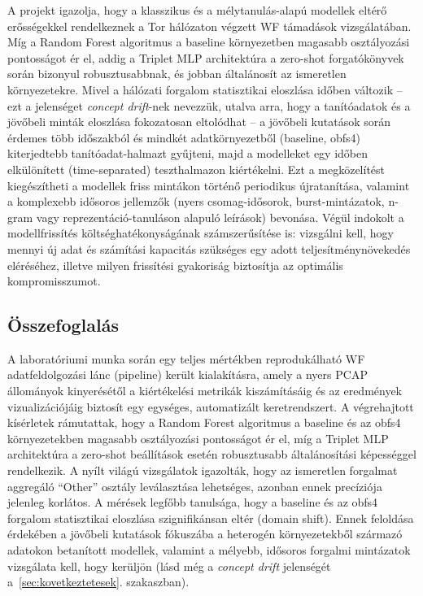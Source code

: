 \documentclass[a4paper,oneside]{article}
\begin{document}
A projekt igazolja, hogy a klasszikus és a mélytanulás-alapú modellek eltérő erősségekkel rendelkeznek a Tor hálózaton végzett WF támadások vizsgálatában.
Míg a Random Forest algoritmus a baseline környezetben magasabb osztályozási pontosságot ér el, addig a Triplet MLP architektúra a zero-shot forgatókönyvek során bizonyul robusztusabbnak, és jobban általánosít az ismeretlen környezetekre.
Mivel a hálózati forgalom statisztikai eloszlása időben változik -- ezt a jelenséget \textit{concept drift}-nek nevezzük, utalva arra, hogy a tanítóadatok és a jövőbeli minták eloszlása fokozatosan eltolódhat -- a jövőbeli kutatások során érdemes több időszakból és mindkét adatkörnyezetből (baseline, obfs4) kiterjedtebb tanítóadat-halmazt gyűjteni, majd a modelleket egy időben elkülönített (time-separated) teszthalmazon kiértékelni.
Ezt a megközelítést kiegészítheti a modellek friss mintákon történő periodikus újratanítása, valamint a komplexebb idősoros jellemzők (nyers csomag-idősorok, burst-mintázatok, n-gram vagy reprezentáció-tanuláson alapuló leírások) bevonása.
Végül indokolt a modellfrissítés költséghatékonyságának számszerűsítése is: vizsgálni kell, hogy mennyi új adat és számítási kapacitás szükséges egy adott teljesítménynövekedés eléréséhez, illetve milyen frissítési gyakoriság biztosítja az optimális kompromisszumot.
\subsection{Összefoglalás}
\label{sec:osszefoglalas}

A laboratóriumi munka során egy teljes mértékben reprodukálható WF adatfeldolgozási lánc (pipeline) került kialakításra, amely a nyers PCAP állományok kinyerésétől a kiértékelési metrikák kiszámításáig és az eredmények vizualizációjáig biztosít egy egységes, automatizált keretrendszert.
A végrehajtott kísérletek rámutattak, hogy a Random Forest algoritmus a baseline és az obfs4 környezetekben magasabb osztályozási pontosságot ér el, míg a Triplet MLP architektúra a zero-shot beállítások esetén robusztusabb általánosítási képességgel rendelkezik.
A nyílt világú vizsgálatok igazolták, hogy az ismeretlen forgalmat aggregáló ``Other'' osztály leválasztása lehetséges, azonban ennek precíziója jelenleg korlátos.
A mérések legfőbb tanulsága, hogy a baseline és az obfs4 forgalom statisztikai eloszlása szignifikánsan eltér (domain shift).
Ennek feloldása érdekében a jövőbeli kutatások fókuszába a heterogén környezetekből származó adatokon betanított modellek, valamint a mélyebb, idősoros forgalmi mintázatok vizsgálata kell, hogy kerüljön (lásd még a \textit{concept drift} jelenségét a~\ref{sec:kovetkeztetesek}. szakaszban).
\newpage
\end{document}
